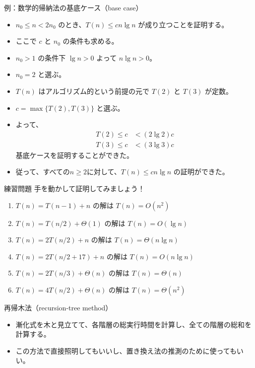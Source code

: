 \documentclass[unicode,11pt,aspectratio=169,notes]{beamer} %
\begin{document}

\begin{frame}{例：数学的帰納法の基底ケース（base case）}
  \begin{itemize}
    \item<+-> $n_0\leq n<2n_0$ のとき、$T(n)\leq cn\lg n$ が成り立つことを証明する。
    \item<+-> ここで $c$ と $n_0$ の条件も求める。
    \item<+-> $n_0>1$ の条件下 $\lg n>0$ よって $n\lg n>0$。
    \item<+-> $n_0=2$ と選ぶ。
    \item<+-> $T(n)$ はアルゴリズム的という前提の元で $T(2)$ と $T(3)$ が定数。
    \item<+-> $c=\max\{T(2), T(3)\}$ と選ぶ。
    \item<+-> よって、
    \begin{align*}
      T(2) \leq c & < (2\lg 2)c \\
      T(3) \leq c & < (3\lg 3)c
    \end{align*}
    基底ケースを証明することができた。
    \item<+-> 従って、すべての$n\geq 2$に対して、$T(n)\leq cn\lg n$ の証明ができた。
  \end{itemize}
\end{frame}

\begin{frame}{練習問題}
  手を動かして証明してみましょう！
  \begin{enumerate}
    \item $T(n)=T(n-1)+n$ の解は $T(n)=O(n^2)$
    \item $T(n)=T(n/2)+\Theta(1)$ の解は $T(n)=O(\lg n)$
    \item $T(n)=2T(n/2)+n$ の解は $T(n)=\Theta(n\lg n)$
    \item $T(n)=2T(n/2+17)+n$ の解は $T(n)=O(n\lg n)$
    \item $T(n)=2T(n/3)+\Theta(n)$ の解は $T(n)=\Theta(n)$
    \item $T(n)=4T(n/2)+\Theta(n)$ の解は $T(n)=\Theta(n^2)$
  \end{enumerate}
\end{frame}

\begin{frame}{再帰木法（recursion-tree method）}
  \begin{itemize}
    \item 漸化式を木と見立てて、各階層の総実行時間を計算し、全ての階層の総和を計算する。
    \item この方法で直接照明してもいいし、置き換え法の推測のために使ってもいい。
  \end{itemize}
\end{frame}
\end{document}
